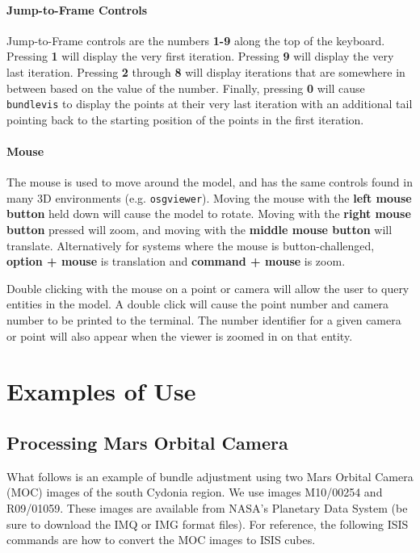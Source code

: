 \paragraph{Jump-to-Frame Controls}
Jump-to-Frame controls are the numbers \textbf{1-9} along the top of
the keyboard. Pressing \textbf{1} will display the very first
iteration. Pressing \textbf{9} will display the very last
iteration. Pressing \textbf{2} through \textbf{8} will display
iterations that are somewhere in between based on the value of the
number. Finally, pressing \textbf{0} will cause \texttt{bundlevis} to
display the points at their very last iteration with an additional
tail pointing back to the starting position of the points in the first
iteration.

\paragraph{Mouse}
The mouse is used to move around the model, and has the same controls
found in many 3D environments (e.g. \texttt{osgviewer}). Moving the
mouse with the \textbf{left mouse button} held down will cause the
model to rotate.  Moving with the \textbf{right mouse button} pressed
will zoom, and moving with the \textbf{middle mouse button} will
translate. Alternatively for systems where the mouse is
button-challenged, \textbf{option + mouse} is translation and
\textbf{command + mouse} is zoom.

Double clicking with the mouse on a point or camera will allow the
user to query entities in the model.  A double click will cause the
point number and camera number to be printed to the terminal. The
number identifier for a given camera or point will also appear when
the viewer is zoomed in on that entity.

\section{Examples of Use}

\subsection{Processing Mars Orbital Camera}

What follows is an example of bundle adjustment using two Mars Orbital
Camera (MOC) images of the south Cydonia region. We use images
M10/00254 and R09/01059. These images are available from NASA's
Planetary Data System (be sure to download the IMQ or IMG format
files). For reference, the following ISIS commands are how to convert
the MOC images to ISIS cubes.

